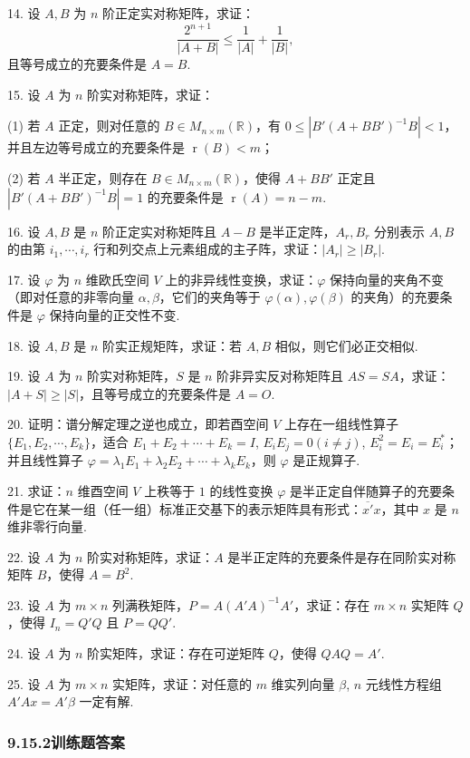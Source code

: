 \documentclass[UTF8,12pt,a4paper,fontset=fandol]{ctexart}
\begin{document}
14. 设 $A,B$ 为 $n$ 阶正定实对称矩阵，求证：
\[
\frac{2^{n+1}}{|A+B|}\le \frac{1}{|A|}+\frac{1}{|B|},
\]
且等号成立的充要条件是 $A=B$.

15. 设 $A$ 为 $n$ 阶实对称矩阵，求证：

(1) 若 $A$ 正定，则对任意的 $B\in M_{n\times m}(\mathbb{R})$，有 $0\le |B'(A+BB')^{-1}B|<1$，并且左边等号成立的充要条件是 $\operatorname{r}(B)<m$；

(2) 若 $A$ 半正定，则存在 $B\in M_{n\times m}(\mathbb{R})$，使得 $A+BB'$ 正定且 $|B'(A+BB')^{-1}B|=1$ 的充要条件是 $\operatorname{r}(A)=n-m$.

16. 设 $A,B$ 是 $n$ 阶正定实对称矩阵且 $A-B$ 是半正定阵，$A_r,B_r$ 分别表示 $A,B$ 的由第 $i_1,\cdots,i_r$ 行和列交点上元素组成的主子阵，求证：$|A_r|\ge |B_r|$.

17. 设 $\varphi$ 为 $n$ 维欧氏空间 $V$ 上的非异线性变换，求证：$\varphi$ 保持向量的夹角不变（即对任意的非零向量 $\alpha,\beta$，它们的夹角等于 $\varphi(\alpha),\varphi(\beta)$ 的夹角）的充要条件是 $\varphi$ 保持向量的正交性不变.

18. 设 $A,B$ 是 $n$ 阶实正规矩阵，求证：若 $A,B$ 相似，则它们必正交相似.

19. 设 $A$ 为 $n$ 阶实对称矩阵，$S$ 是 $n$ 阶非异实反对称矩阵且 $AS=SA$，求证：$|A+S|\ge |S|$，且等号成立的充要条件是 $A=O$.

20. 证明：谱分解定理之逆也成立，即若酉空间 $V$ 上存在一组线性算子 $\{E_1,E_2,\cdots,E_k\}$，适合 $E_1+E_2+\cdots+E_k=I$, $E_iE_j=0(i\ne j)$, $E_i^2=E_i=E_i^*$；并且线性算子 $\varphi=\lambda_1E_1+\lambda_2E_2+\cdots+\lambda_kE_k$，则 $\varphi$ 是正规算子.

21. 求证：$n$ 维酉空间 $V$ 上秩等于 $1$ 的线性变换 $\varphi$ 是半正定自伴随算子的充要条件是它在某一组（任一组）标准正交基下的表示矩阵具有形式：$\overline{x'}x$，其中 $x$ 是 $n$ 维非零行向量.

22. 设 $A$ 为 $n$ 阶实对称矩阵，求证：$A$ 是半正定阵的充要条件是存在同阶实对称矩阵 $B$，使得 $A=B^2$.

23. 设 $A$ 为 $m\times n$ 列满秩矩阵，$P=A(A'A)^{-1}A'$，求证：存在 $m\times n$ 实矩阵 $Q$，使得 $I_n=Q'Q$ 且 $P=QQ'$.

24. 设 $A$ 为 $n$ 阶实矩阵，求证：存在可逆矩阵 $Q$，使得 $QAQ=A'$.

25. 设 $A$ 为 $m\times n$ 实矩阵，求证：对任意的 $m$ 维实列向量 $\beta$, $n$ 元线性方程组 $A'Ax=A'\beta$ 一定有解.

\subsubsection*{9.15.2\quad 训练题答案}
\end{document}
